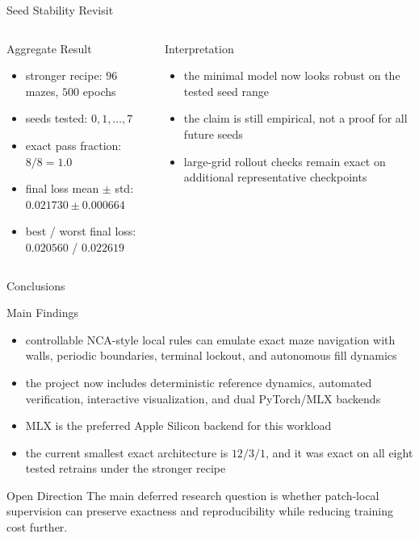 \documentclass[aspectratio=169,11pt]{beamer}
\begin{document}
\begin{frame}{Seed Stability Revisit}
\begin{columns}[T,totalwidth=\textwidth]
\small
\begin{block}{Aggregate Result}
\begin{itemize}
  \item stronger recipe: \(96\) mazes, \(500\) epochs
  \item seeds tested: \(0,1,\dots,7\)
  \item exact pass fraction: \(8/8 = 1.0\)
  \item final loss mean \(\pm\) std: \(0.021730 \pm 0.000664\)
  \item best / worst final loss: \(0.020560\) / \(0.022619\)
\end{itemize}
\end{block}

\small
\begin{alertblock}{Interpretation}
\begin{itemize}
  \item the minimal model now looks robust on the tested seed range
  \item the claim is still empirical, not a proof for all future seeds
  \item large-grid rollout checks remain exact on additional representative checkpoints
\end{itemize}
\end{alertblock}
\end{columns}
\end{frame}

\begin{frame}{Conclusions}
\begin{block}{Main Findings}
\begin{itemize}
  \item controllable NCA-style local rules can emulate exact maze navigation with walls, periodic boundaries, terminal lockout, and autonomous fill dynamics
  \item the project now includes deterministic reference dynamics, automated verification, interactive visualization, and dual PyTorch/MLX backends
  \item MLX is the preferred Apple Silicon backend for this workload
  \item the current smallest exact architecture is \(12/3/1\), and it was exact on all eight tested retrains under the stronger recipe
\end{itemize}
\end{block}

\begin{block}{Open Direction}
The main deferred research question is whether patch-local supervision can preserve exactness and reproducibility while reducing training cost further.
\end{block}
\end{frame}
\end{document}
